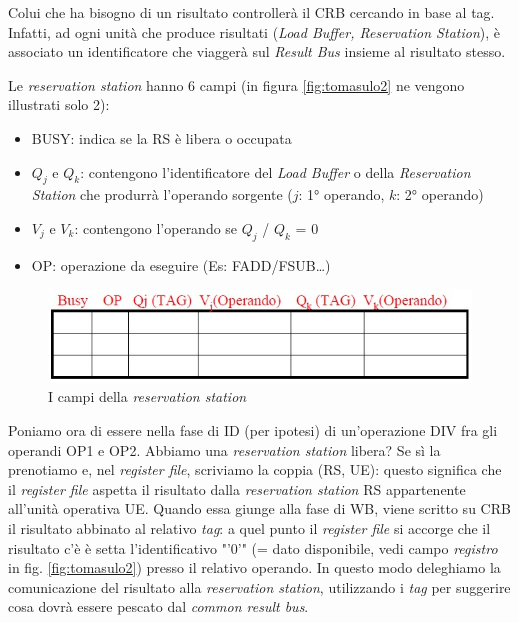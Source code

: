 Colui che ha bisogno di un risultato controllerà il CRB cercando in base al tag. Infatti, ad ogni unità che produce risultati (\textit{Load Buffer, Reservation Station}), è associato un identificatore che viaggerà sul \textit{Result Bus} insieme al risultato stesso.

Le \textit{reservation station} hanno 6 campi (in figura \ref{fig:tomasulo2} ne vengono illustrati solo 2):
\begin{itemize}
\item  BUSY: indica se la RS è libera o occupata
\item  $Q_j$ e $Q_k$: contengono l'identificatore del \textit{Load Buffer} o della \textit{Reservation
Station} che produrrà l'operando sorgente ($j$: 1° operando, $k$: 2° operando)
\item  $V_j$ e $V_k$: contengono l'operando se $Q_j$ / $Q_k$ = 0
\item  OP: operazione da eseguire (Es: FADD/FSUB\ldots)
\end{itemize}
\begin{figure}[!h]
\centering
\includegraphics[width=0.75\columnwidth]{img/reservationStation}
\caption{I campi della \textit{reservation station}}
\label{fig:reservationStation}
\end{figure}

Poniamo ora di essere nella fase di ID (per ipotesi) di un'operazione DIV fra gli operandi OP1 e OP2. Abbiamo una \textit{reservation station} libera? Se sì la prenotiamo e, nel \textit{register file}, scriviamo la coppia (RS, UE): questo significa che il \textit{register file} aspetta il risultato dalla \textit{reservation station} RS appartenente all'unità operativa UE. Quando essa giunge alla fase di WB, viene scritto su CRB il risultato abbinato al relativo \textit{tag}: a quel punto il \textit{register file} si accorge che il risultato c'è è setta l'identificativo "'0'" (= dato disponibile, vedi campo \textit{registro} in fig. \ref{fig:tomasulo2}) presso il relativo operando. In questo modo deleghiamo la comunicazione del risultato alla \textit{reservation station}, utilizzando i \textit{tag} per suggerire cosa dovrà essere pescato dal \textit{common result bus}.

